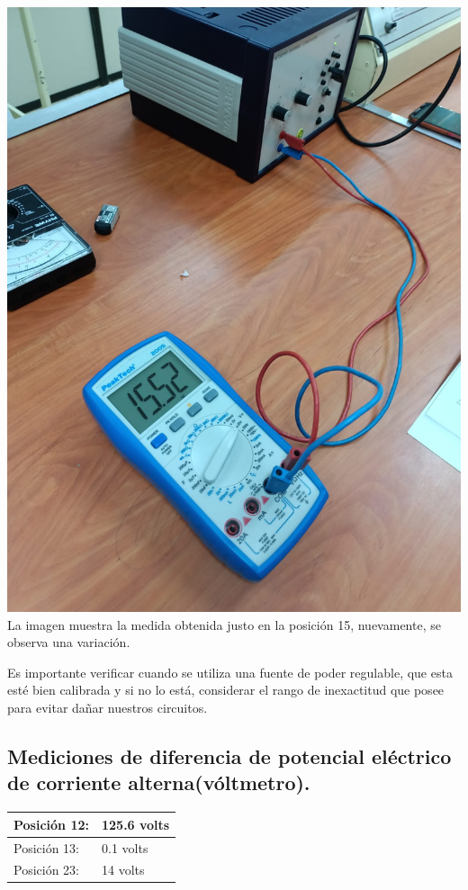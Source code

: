 \documentclass[10pt]{article}
\begin{document}
\begin{multicols}{2}
\begin{center}
	\includegraphics[scale = 0.1]{Imagenes/Fotos/Quince.jpeg}\\
	La imagen muestra la medida obtenida justo en la posición 15, nuevamente, se observa una variación.
 \end{center}

 Es importante verificar cuando se utiliza una fuente de poder regulable, que esta esté bien calibrada y si no lo está, considerar el rango de inexactitud que posee para evitar dañar nuestros circuitos.
\subsection{Mediciones de diferencia de potencial eléctrico de corriente alterna(vóltmetro).}

\begin{tabular}{ p{4cm} p{3cm} }
	\hline
	Posición 12: & 125.6 volts \\
	\hline
	Posición 13: & 0.1 volts \\
	\hline
	Posición 23: & 14 volts \\
	\hline
\end{tabular}


\end{multicols}
\end{document}
